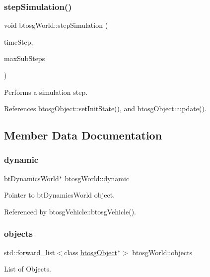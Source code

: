 \subsubsection{\texorpdfstring{step\+Simulation()}{stepSimulation()}}
{\footnotesize\ttfamily void btosg\+World\+::step\+Simulation (\begin{DoxyParamCaption}\item[{bt\+Scalar}]{time\+Step,  }\item[{int}]{max\+Sub\+Steps }\end{DoxyParamCaption})}

Performs a simulation step. 

References btosg\+Object\+::set\+Init\+State(), and btosg\+Object\+::update().



\subsection{Member Data Documentation}
\mbox{\label{classbtosgWorld_ad757a7b3b845142f200d1f2127e5372e}} 
\subsubsection{\texorpdfstring{dynamic}{dynamic}}
{\footnotesize\ttfamily bt\+Dynamics\+World$\ast$ btosg\+World\+::dynamic}

Pointer to bt\+Dynamics\+World object. 

Referenced by btosg\+Vehicle\+::btosg\+Vehicle().

\mbox{\label{classbtosgWorld_ab105aa8c0f8bdbdf323d47b902f6aca0}} 
\subsubsection{\texorpdfstring{objects}{objects}}
{\footnotesize\ttfamily std\+::forward\+\_\+list$<$class \hyperlink{classbtosgObject}{btosg\+Object}$\ast$$>$ btosg\+World\+::objects}



List of Objects. 

\mbox{\label{classbtosgWorld_ab6d438f54ccfc18955ea43e87731e008}} 
